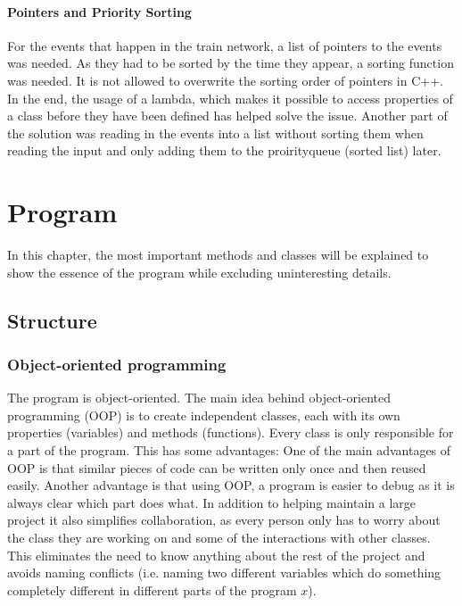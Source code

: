 \documentclass[10pt]{scrreprt}
\begin{document}
\subsubsection{Pointers and Priority Sorting}
For the events that happen in the train network, a list of pointers to the events was needed. As they had to be sorted by the time they appear, a sorting function was needed. It is not allowed to overwrite the sorting order of pointers in C++. In the end, the usage of a lambda, which makes it possible to access properties of a class before they have been defined has helped solve the issue. Another part of the solution was reading in the events into a list without sorting them when reading the input and only adding them to the proirityqueue (sorted list) later.

\chapter{Program}

In this chapter, the most important methods and classes will be explained to show the essence of the program while excluding uninteresting details.

\section{Structure}

\subsection{Object-oriented programming}
The program is object-oriented. The main idea behind object-oriented programming (OOP) is to create independent classes, each with its own properties (variables) and methods (functions). Every class is only responsible for a part of the program. This has some advantages: One of the main advantages of OOP is that similar pieces of code can be written only once and then reused easily. Another advantage is that using OOP, a program is easier to debug as it is always clear which part does what. In addition to helping maintain a large project it also simplifies collaboration, as every person only has to worry about the class they are working on and some of the interactions with other classes. This eliminates the need to know anything about the rest of the project and avoids naming conflicts (i.e. naming two different variables which do something completely different in different parts of the program $x$).

\end{document}
